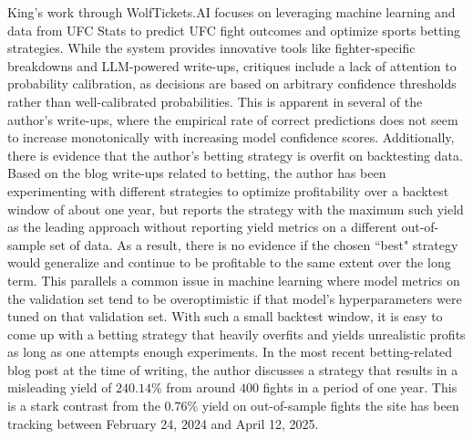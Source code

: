 \documentclass[12pt,twoside]{report}
\begin{document}
King's work through WolfTickets.AI \citep{king_wolftickets} focuses on leveraging machine learning and data from UFC Stats to predict UFC fight outcomes and optimize sports betting strategies. While the system provides innovative tools like fighter-specific breakdowns and LLM-powered write-ups, critiques include a lack of attention to probability calibration, as decisions are based on arbitrary confidence thresholds rather than well-calibrated probabilities. This is apparent in several of the author's write-ups, where the empirical rate of correct predictions does not seem to increase monotonically with increasing model confidence scores. Additionally, there is evidence that the author's betting strategy is overfit on backtesting data. Based on the blog write-ups related to betting, the author has been experimenting with different strategies to optimize profitability over a backtest window of about one year, but reports the strategy with the maximum such yield as the leading approach without reporting yield metrics on a different out-of-sample set of data. As a result, there is no evidence if the chosen ``best" strategy would generalize and continue to be profitable to the same extent over the long term. This parallels a common issue in machine learning where model metrics on the validation set tend to be overoptimistic if that model's hyperparameters were tuned on that validation set. With such a small backtest window, it is easy to come up with a betting strategy that heavily overfits and yields unrealistic profits as long as one attempts enough experiments. In the most recent betting-related blog post at the time of writing, the author discusses a strategy that results in a misleading yield of $240.14$\% from around $400$ fights in a period of one year. This is a stark contrast from the $0.76$\% yield on out-of-sample fights the site has been tracking between February 24, 2024 and April 12, 2025.
\end{document}
